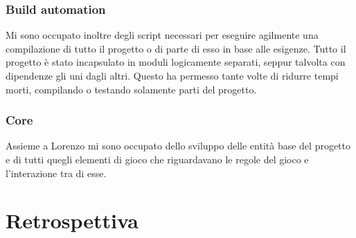 \documentclass{article}
\begin{document}
    \subsubsection{Build automation}
    Mi sono occupato inoltre degli script necessari per eseguire agilmente una compilazione di tutto il progetto o di parte di esso in base alle esigenze.
    Tutto il progetto è stato incapsulato in moduli logicamente separati, seppur talvolta con dipendenze gli uni dagli altri.
    Questo ha permesso tante volte di ridurre tempi morti, compilando o testando solamente parti del progetto.

    \subsubsection{Core}
    Assieme a Lorenzo mi sono occupato dello sviluppo delle entità base del progetto e di tutti quegli elementi di gioco che riguardavano le regole del gioco e l'interazione tra di esse.

    \newpage


    \section{Retrospettiva}\label{sec:retrospettiva}
    
\end{document}
